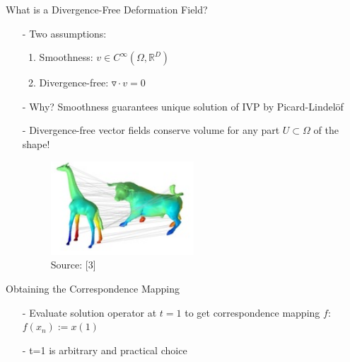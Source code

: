 \documentclass[xcolor=dvipsnames]{beamer}
\begin{document}
\begin{frame}{What is a Divergence-Free Deformation Field?}
\begin{enumerate}
\item[-]Two assumptions:
\begin{enumerate}
	\item Smoothness: $v \in C^\infty(\Omega, \mathbb{R}^D)$
	\item Divergence-free: $\triangledown\cdot v = 0 $
\end{enumerate}
\item[-]Why? Smoothness guarantees unique solution of IVP by Picard-Lindelöf
\pause
\item[-]Divergence-free vector fields conserve volume for any part $U \subset \Omega$ of the shape!
\begin{figure}
\includegraphics[height=3.5cm]{Pictures/badCorrespondence.png}
\caption*{Source: [3]}
\end{figure}
\end{enumerate}
\end{frame}

\begin{frame}{Obtaining the Correspondence Mapping}
\begin{enumerate}
\item[-] Evaluate solution operator at $t=1$ to get correspondence mapping $f$:\\ $f(x_n) := x(1)$
\item[-] t=1 is arbitrary and practical choice
\end{enumerate}
\end{frame}
\end{document}
